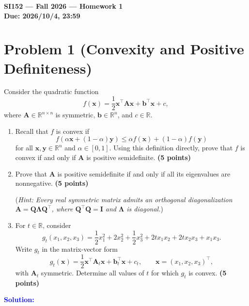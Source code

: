 \documentclass[10pt,a4paper]{article}
\newcommand{\solution}{\par\medskip
    \textcolor{blue}{\textbf{Solution:}}\par\smallskip}
\begin{document}
\begin{center}
    {\Large\bfseries SI152 --- Fall 2026 --- Homework 1}\\[0.6em]
    \textbf{Due: 2026/10/4, 23:59}
\end{center}



\section*{Problem 1 (Convexity and Positive Definiteness)}

Consider the quadratic function
\[
    f(\mathbf{x})
    =\frac12 \mathbf{x}^\top\mathbf{A}\mathbf{x}
    +\mathbf{b}^\top\mathbf{x}+c,
\]
where $\mathbf{A}\in\mathbb{R}^{n\times n}$ is symmetric,
$\mathbf{b}\in\mathbb{R}^n$, and $c\in\mathbb{R}$.

\begin{enumerate}
    \item 
    Recall that $f$ is convex if
    \[
        f(\alpha\mathbf{x}+(1-\alpha)\mathbf{y})
        \leq \alpha f(\mathbf{x})+(1-\alpha)f(\mathbf{y})
    \]
    for all $\mathbf{x},\mathbf{y}\in\mathbb{R}^n$
    and $\alpha\in[0,1]$.
    Using this definition directly, prove that $f$ is convex
    if and only if $\mathbf{A}$ is positive semidefinite. \textbf{(5 points)}

    \item 
    Prove that $\mathbf{A}$ is positive semidefinite if and only if
    all its eigenvalues are nonnegative. \textbf{(5 points)}

    (\textit{Hint: Every real symmetric matrix admits an
    orthogonal diagonalization
    $\mathbf{A}=\mathbf{Q}\boldsymbol{\Lambda}\mathbf{Q}^\top$,
    where $\mathbf{Q}^\top\mathbf{Q}=\mathbf{I}$
    and $\boldsymbol{\Lambda}$ is diagonal.})

    \item 
    For $t\in\mathbb{R}$, consider
    \[
        g_t(x_1,x_2,x_3)
        =
        \frac12 x_1^2+2x_2^2+\frac12 x_3^2
        +2t x_1x_2+2t x_2x_3+x_1x_3.
    \]
    Write $g_t$ in the matrix-vector form
    \[
        g_t(\mathbf{x})
        =\frac12 \mathbf{x}^\top\mathbf{A}_t\mathbf{x}
        +\mathbf{b}_t^\top\mathbf{x}+c_t,
        \qquad \mathbf{x}=(x_1,x_2,x_3)^\top,
    \]
    with $\mathbf{A}_t$ symmetric.
    Determine all values of $t$ for which $g_t$ is convex. \textbf{(5 points)}
\end{enumerate}


\solution
\end{document}
